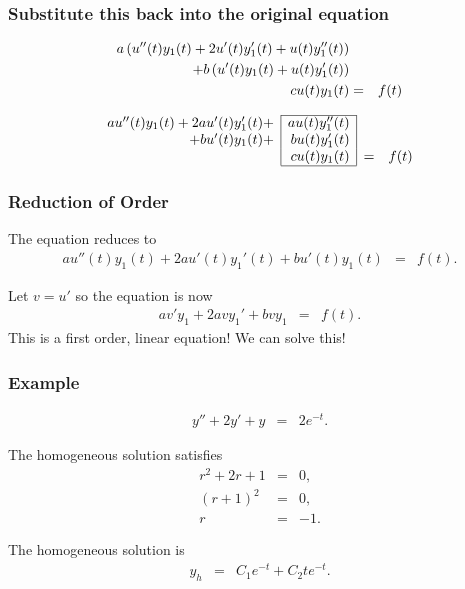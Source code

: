 \begin{frame}
  \frametitle{Substitute this back into the original equation}

  \begin{eqnarray*}
    a \left( u''(t) y_1(t) + 2 u'(t) y_1'(t) + u(t) y_1''(t) \right) & & \\
    + b \left( u'(t) y_1(t) + u(t) y_1'(t) \right) & & \\
    c u(t) y_1(t) & = & f(t) 
  \end{eqnarray*}

  \begin{eqnarray*}
    \begin{array}{r|r|cl}
      \cline{2-2}
      a u''(t) y_1(t) + 2 a u'(t) y_1'(t) + & a u(t) y_1''(t)  & & \\ 
      + b  u'(t) y_1(t) + & b u(t) y_1'(t)  & & \\
      & c u(t) y_1(t) & = & f(t)  \\       \cline{2-2}
    \end{array}
  \end{eqnarray*}

\end{frame}


\begin{frame}
  \frametitle{Reduction of Order}

  The equation reduces to
  \begin{eqnarray*}
    a u''(t) y_1(t) + 2 a u'(t) y_1'(t) + b  u'(t) y_1(t) & = & f(t).
  \end{eqnarray*}

  Let $v=u'$ so the equation is now
  \begin{eqnarray*}
    a v' y_1 + 2 a v y_1' + b v y_1 & = & f(t).
  \end{eqnarray*}
  This is a first order, linear equation! We can solve this!


\end{frame}


\begin{frame}
  \frametitle{Example}

  \begin{eqnarray*}
    y'' + 2 y' + y & = & 2 e^{-t}.
  \end{eqnarray*}

  The homogeneous solution satisfies
  \begin{eqnarray*}
    r^2 + 2r + 1 & = & 0, \\
    (r+1)^2 & = & 0, \\
    r & = & -1.
  \end{eqnarray*}

  The homogeneous solution is
  \begin{eqnarray*}
    y_h & = & C_1 e^{-t} + C_2 t e^{-t}.
  \end{eqnarray*}

\end{frame}


